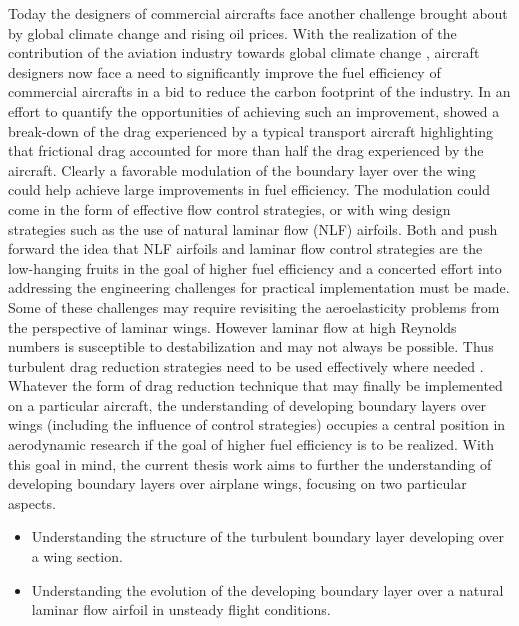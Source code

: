 Today the designers of commercial aircrafts face another challenge brought about by global climate change and rising oil prices. With the realization of the contribution of the aviation industry towards global climate change \citep{green08}, aircraft designers now face a need to significantly improve the fuel efficiency of commercial aircrafts in a bid to reduce the carbon footprint of the industry. In an effort to quantify the opportunities of achieving such an improvement, \cite{schrauf05} showed a break-down of the drag experienced by a typical transport aircraft highlighting that frictional drag accounted for more than half the drag experienced by the aircraft. Clearly a favorable modulation of the boundary layer over the wing could help achieve large improvements in fuel efficiency. The modulation could come in the form of effective flow control strategies, or with wing design strategies such as the use of natural laminar flow (NLF) airfoils. Both \cite{schrauf05} and \cite{green08} push forward the idea that NLF airfoils and laminar flow control strategies are the low-hanging fruits in the goal of higher fuel efficiency and a concerted effort into addressing the engineering challenges for practical implementation must be made. Some of these challenges may require revisiting the aeroelasticity problems from the perspective of laminar wings. However laminar flow at high Reynolds numbers is susceptible to destabilization and may not always be possible. Thus turbulent drag reduction strategies need to be used effectively where needed \citep{bushnell03}. Whatever the form of drag reduction technique that may finally be implemented on a particular aircraft, the understanding of developing boundary layers over wings (including the influence of control strategies) occupies a central position in aerodynamic research if the goal of higher fuel efficiency is to be realized. With this goal in mind, the current thesis work aims to further the understanding of developing boundary layers over airplane wings, focusing on two particular aspects.
\begin{itemize}
	\item Understanding the structure of the turbulent boundary layer developing over a wing section.	
	\item Understanding the evolution of the developing boundary layer over a natural laminar flow airfoil in unsteady flight conditions. 
\end{itemize}


